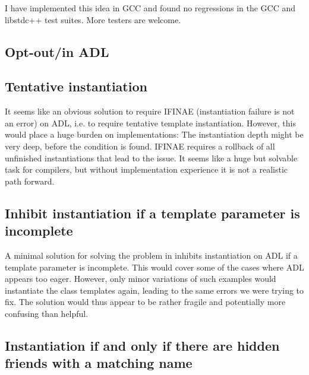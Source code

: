 I have implemented this idea in GCC and found no regressions in the GCC and libstdc++ test 
suites. More testers are welcome.


\subsection{Opt-out/in ADL}

\subsection{Tentative instantiation}
It seems like an obvious solution to require IFINAE (instantiation failure is not an 
error) on ADL, i.e. to require tentative template instantiation. However, this would place 
a huge burden on implementations: The instantiation depth might be very deep, before the 
condition is found. IFINAE requires a rollback of all unfinished instantiations that lead 
to the issue. It seems like a huge but solvable task for compilers, but without 
implementation experience it is not a realistic path forward.

\subsection{Inhibit instantiation if a template parameter is incomplete}

A minimal solution for solving the problem in  inhibits instantiation on ADL 
if a template parameter is incomplete. This would cover some of the cases where ADL 
appears too eager. However, only minor variations of such examples would instantiate the 
class templates again, leading to the same errors we were trying to fix. The solution 
would thus appear to be rather fragile and potentially more confusing than helpful.

\subsection{Instantiation if and only if there are hidden friends with a matching name}

